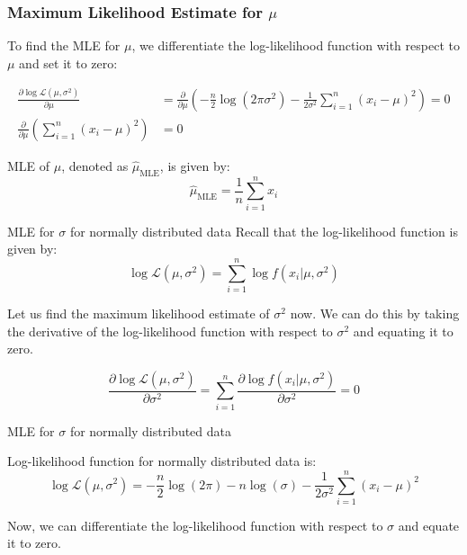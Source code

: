 \documentclass[handout]{beamer}
\begin{document}
\begin{frame}
    \frametitle{Maximum Likelihood Estimate for $\mu$}
    
    To find the MLE for $\mu$, we differentiate the log-likelihood function with respect to $\mu$ and set it to zero:
    
    \begin{align*}
        \frac{\partial \log \mathcal{L}(\mu, \sigma^2)}{\partial \mu} &= \frac{\partial}{\partial \mu} \left(-\frac{n}{2} \log (2\pi\sigma^2) - \frac{1}{2\sigma^2} \sum_{i=1}^n (x_i-\mu)^2\right) =0\\
        \frac{\partial}{\partial \mu} \left(\sum_{i=1}^n (x_i-\mu)^2\right) &= 0
    \end{align*}
    
    \begin{tcolorbox}[colback=metropolisblue!5,colframe=metropolisblue,title=Maximum Likelihood Estimate for $\mu$]
        MLE of $\mu$, denoted as $\hat{\mu}_{\text{MLE}}$, is given by:
        \begin{equation*}
            \hat{\mu}_{\text{MLE}} = \frac{1}{n}\sum_{i=1}^n x_i
        \end{equation*}
    \end{tcolorbox}
    
    \end{frame}

\begin{frame}{MLE for $\sigma$ for normally distributed data}
    Recall that the log-likelihood function is given by:
    \begin{equation}
        \log \mathcal{L}(\mu, \sigma^2) = \sum_{i=1}^n \log f(x_i|\mu, \sigma^2)
    \end{equation}

    Let us find the maximum likelihood estimate of $\sigma^2$ now. We can do this by taking the derivative of the log-likelihood function with respect to $\sigma^2$ and equating it to zero.   

    \begin{equation}
        \frac{\partial \log \mathcal{L}(\mu, \sigma^2)}{\partial \sigma^2} = \sum_{i=1}^n \frac{\partial \log f(x_i|\mu, \sigma^2)}{\partial \sigma^2} = 0
    \end{equation}
    
\end{frame}

\begin{frame}{MLE for $\sigma$ for normally distributed data}
    \begin{tcolorbox}[colback=metropolisblue!5,colframe=metropolisblue,title=Log Likelihood Function for Univariate Normal Distribution]
        Log-likelihood function for normally distributed data is:
        \[
            \log \mathcal{L}(\mu, \sigma^2) = -\frac{n}{2} \log(2\pi) - n\log(\sigma) - \frac{1}{2\sigma^2} \sum_{i=1}^n (x_i-\mu)^2
            \]
    \end{tcolorbox}

Now, we can differentiate the log-likelihood function with respect to $\sigma$ and equate it to zero.
\end{frame}
\end{document}
